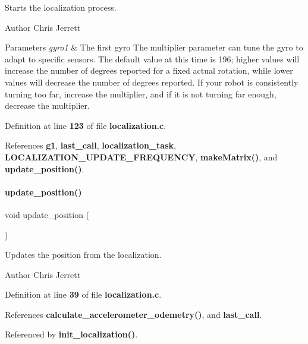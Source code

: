 Starts the localization process. 

\begin{DoxyAuthor}{Author}
Chris Jerrett
\end{DoxyAuthor}

\begin{DoxyParams}{Parameters}
{\em gyro1} & The first gyro  The multiplier parameter can tune the gyro to adapt to specific sensors. The default value at this time is 196; higher values will increase the number of degrees reported for a fixed actual rotation, while lower values will decrease the number of degrees reported. If your robot is consistently turning too far, increase the multiplier, and if it is not turning far enough, decrease the multiplier. \\
\hline
\end{DoxyParams}


Definition at line \textbf{ 123} of file \textbf{ localization.\+c}.



References \textbf{ g1}, \textbf{ last\+\_\+call}, \textbf{ localization\+\_\+task}, \textbf{ L\+O\+C\+A\+L\+I\+Z\+A\+T\+I\+O\+N\+\_\+\+U\+P\+D\+A\+T\+E\+\_\+\+F\+R\+E\+Q\+U\+E\+N\+CY}, \textbf{ make\+Matrix()}, and \textbf{ update\+\_\+position()}.

\mbox{\label{localization_8h_afacd5e0b3d5e677df26a4402bbd9ec9e}} 
\paragraph{update\+\_\+position()}
{\footnotesize\ttfamily void update\+\_\+position (\begin{DoxyParamCaption}{ }\end{DoxyParamCaption})}



Updates the position from the localization. 

\begin{DoxyAuthor}{Author}
Chris Jerrett 
\end{DoxyAuthor}


Definition at line \textbf{ 39} of file \textbf{ localization.\+c}.



References \textbf{ calculate\+\_\+accelerometer\+\_\+odemetry()}, and \textbf{ last\+\_\+call}.



Referenced by \textbf{ init\+\_\+localization()}.

